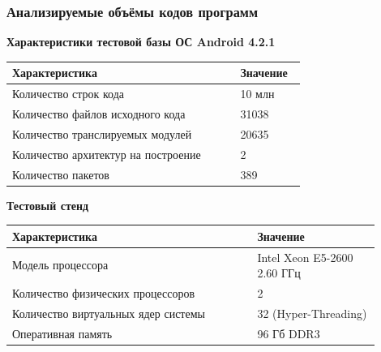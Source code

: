 \documentclass[hyperref={pdfpagelabels=false},10pt,gray]{beamer}
\begin{document}
\begin{frame}
\frametitle{Анализируемые объёмы кодов программ}
\textbf{Характеристики тестовой базы ОС Android 4.2.1}
\begin{table} [htbp]
  \centering
  \parbox{15cm}{\label{table:android-char}}
  \begin{tabular}{| p{0.7\linewidth} || p{0.2\linewidth} |}
  \hline
  \hline
  \textbf{Характеристика}   & \textbf{Значение} \\
  \hline
  \hline
  Количество строк кода   & 10 млн \\
  \hline
  Количество файлов исходного кода      & 31038    \\
  \hline
  Количество транслируемых модулей  & 20635   \\
  \hline
  Количество архитектур на построение & 2   \\
  \hline
  Количество пакетов & 389 \\
  \hline
  \hline
  \end{tabular}
\end{table}
\textbf{Тестовый стенд}
\begin{table} [htbp]
  \begin{tabular}{| p{0.6\linewidth} || p{0.3\linewidth} |}
  \hline
  \hline
  Характеристика   & Значение \\
  \hline
  \hline
  Модель процессора   & Intel Xeon E5-2600 2.60 ГГц \\
  \hline
  Количество физических процессоров & 2   \\
  \hline
  Количество виртуальных ядер системы & 32 (Hyper-Threading)   \\
  \hline
  Оперативная память & 96 Гб DDR3 \\
  \hline
  \hline
  \end{tabular}
\end{table}

\end{frame}
\end{document}
